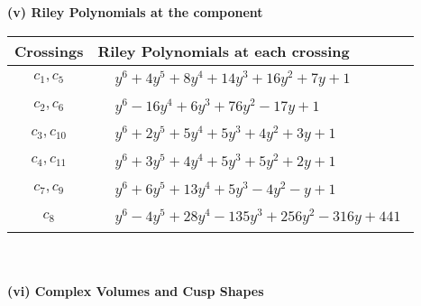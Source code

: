 \documentclass[1p]{elsarticle_modified}
\theoremstyle{definition}
\begin{document}
\newpage\renewcommand{\arraystretch}{1}
\flushleft \textbf{(v) Riley Polynomials at the component}\newline \\
\begin{tabular}{m{50pt}|m{274pt}}
Crossings & \hspace{64pt}Riley Polynomials at each crossing \\
\hline $$\begin{aligned}c_{1},c_{5}\end{aligned}$$&$\begin{aligned}
&y^6+4 y^5+8 y^4+14 y^3+16 y^2+7 y+1
\end{aligned}$\\
\hline $$\begin{aligned}c_{2},c_{6}\end{aligned}$$&$\begin{aligned}
&y^6-16 y^4+6 y^3+76 y^2-17 y+1
\end{aligned}$\\
\hline $$\begin{aligned}c_{3},c_{10}\end{aligned}$$&$\begin{aligned}
&y^6+2 y^5+5 y^4+5 y^3+4 y^2+3 y+1
\end{aligned}$\\
\hline $$\begin{aligned}c_{4},c_{11}\end{aligned}$$&$\begin{aligned}
&y^6+3 y^5+4 y^4+5 y^3+5 y^2+2 y+1
\end{aligned}$\\
\hline $$\begin{aligned}c_{7},c_{9}\end{aligned}$$&$\begin{aligned}
&y^6+6 y^5+13 y^4+5 y^3-4 y^2- y+1
\end{aligned}$\\
\hline $$\begin{aligned}c_{8}\end{aligned}$$&$\begin{aligned}
&y^6-4 y^5+28 y^4-135 y^3+256 y^2-316 y+441
\end{aligned}$\\
\hline
\end{tabular}\\~\\
\newpage\flushleft \textbf{(vi) Complex Volumes and Cusp Shapes}
\end{document}
